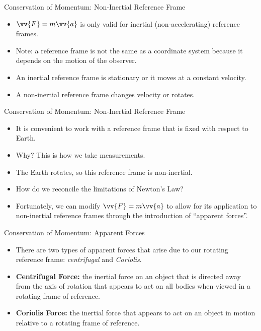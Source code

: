 \begin{frame}{Conservation of Momentum: Non-Inertial Reference Frame}
\begin{itemize}
	\item $\vv{F} = m\vv{a}$ is only valid for inertial (non-accelerating) reference frames.
	\item Note: a reference frame is not the same as a coordinate system because it depends on the motion of the observer.
	\item An inertial reference frame is stationary or it moves at a constant velocity.
	\item A non-inertial reference frame changes velocity or rotates.
\end{itemize}
\end{frame}
\begin{frame}{Conservation of Momentum: Non-Inertial Reference Frame}
\begin{itemize}
	\item It is convenient to work with a reference frame that is fixed with respect to Earth.
	\item Why? This is how we take measurements.
	\item The Earth rotates, so this reference frame is non-inertial. 
	\item How do we reconcile the limitations of Newton's  Law?
	\item Fortunately, we can modify $\vv{F} = m\vv{a}$ to allow for its application to non-inertial reference frames through the introduction of ``apparent forces''.
\end{itemize}
\end{frame}
\begin{frame}{Conservation of Momentum: Apparent Forces}
\begin{itemize}
	\item There are two types of apparent forces that arise due to our rotating reference frame: \textit{centrifugal} and \textit{Coriolis}.
	\item \textbf{Centrifugal Force:} the inertial force on an object that is directed away from the axis of rotation that appears to act on all bodies when viewed in a rotating frame of reference.
	\item \textbf{Coriolis Force:} the inertial force that appears to act on an object in motion relative to a rotating frame of reference.
\end{itemize}
\end{frame}

